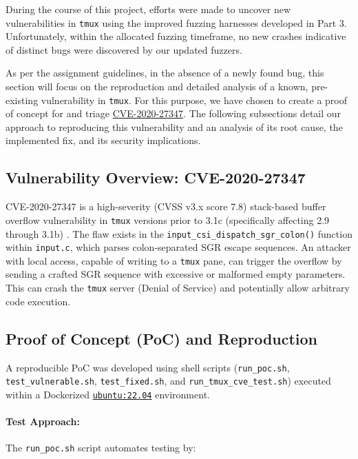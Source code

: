 During the course of this project, efforts were made to uncover new vulnerabilities in \texttt{tmux} using the improved fuzzing harnesses developed in Part 3. Unfortunately, within the allocated fuzzing timeframe, no new crashes indicative of distinct bugs were discovered by our updated fuzzers.

As per the assignment guidelines, in the absence of a newly found bug, this section will focus on the reproduction and detailed analysis of a known, pre-existing vulnerability in \texttt{tmux}. For this purpose, we have chosen to create a proof of concept for and triage \href{https://www.cve.org/CVERecord?id=CVE-2020-27347}{CVE-2020-27347}. The following subsections detail our approach to reproducing this vulnerability and an analysis of its root cause, the implemented fix, and its security implications.

\subsection{Vulnerability Overview: CVE-2020-27347}

CVE-2020-27347 is a high-severity (CVSS v3.x score 7.8) stack-based buffer overflow vulnerability in {\texttt{tmux}} versions prior to 3.1c (specifically affecting 2.9 through 3.1b) \cite{CVE-2020-27347}. The flaw exists in the \texttt{input\_csi\_dispatch\_sgr\_colon()} function within \texttt{input.c}, which parses colon-separated SGR escape sequences. An attacker with local access, capable of writing to a {\texttt{tmux}} pane, can trigger the overflow by sending a crafted SGR sequence with excessive or malformed empty parameters. This can crash the \texttt{tmux} server (Denial of Service) and potentially allow arbitrary code execution.

\subsection{Proof of Concept (PoC) and Reproduction}

A reproducible PoC was developed using shell scripts (\texttt{run\_poc.sh}, \texttt{test\_vulnerable.sh}, \texttt{test\_fixed.sh}, and \texttt{run\_tmux\_cve\_test.sh}) executed within a Dockerized \href{https://hub.docker.com/layers/library/ubuntu/22.04/images/sha256-a76d0e9d99f0e91640e35824a6259c93156f0f07b7778ba05808c750e7fa6e68}{\texttt{ubuntu:22.04}} environment.

\paragraph{Test Approach:}
The \texttt{run\_poc.sh} script automates testing by:

